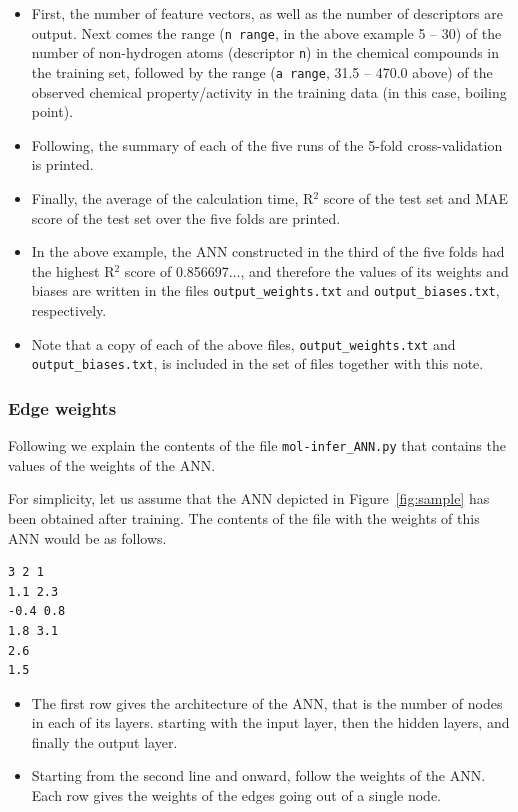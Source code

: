 \documentclass[11pt, titlepage, dvipdfmx, twoside]{article}
\newcommand{\figref}[1]{Figure~\ref{fig:#1}}
\begin{document}
\begin{itemize}
\item  
First, the number of feature vectors, as well as the
number of descriptors are output.
Next comes the range 
(\verb|n range|, in the above example 5 -- 30)
of the number of non-hydrogen atoms (descriptor \verb|n|)
in the chemical
compounds in the training set, 
followed by the range 
(\verb|a range|,  31.5 -- 470.0 above)
of the observed 
chemical property/activity in the training data
(in this case, boiling point).

\item 
Following, the summary of each of the five runs of the
5-fold cross-validation is printed.

\item
Finally, the average of the calculation time,
R$^2$ score of the test set and MAE score of the test set over the 
five folds are printed.

\item 
In the above example, the ANN constructed 
in the third of the five folds had the 
highest R$^2$ score of 0.856697$\dots$, 
and therefore the values of its weights and
biases are written in the files
\verb|output_weights.txt| and \verb|output_biases.txt|, respectively.

\item
Note that a copy of each of the above files, 
\verb|output_weights.txt| and \verb|output_biases.txt|, 
is included in the set of files together with this note.
\end{itemize}


\subsubsection{Edge weights}
Following we explain the contents of the file
\verb|mol-infer_ANN.py|
that contains the values of the weights of the ANN.


For simplicity, let us assume that the ANN depicted
in \figref{sample} has been obtained after training.
The contents of the file with the weights of this ANN
would be as follows.
%
\begin{oframed}
{\small
\begin{verbatim}
3 2 1
1.1 2.3
-0.4 0.8
1.8 3.1
2.6
1.5
\end{verbatim}
}
\end{oframed}
%
\begin{itemize}
\item 
The first row gives the architecture of the ANN,
that is the number of nodes in each of its layers.
starting with the input layer, then the hidden layers, and
finally the output layer.

\item 
Starting from the second line and onward,
follow the weights of the ANN.
Each row gives the weights of the edges going out of a single node.
\end{itemize}
\end{document}
